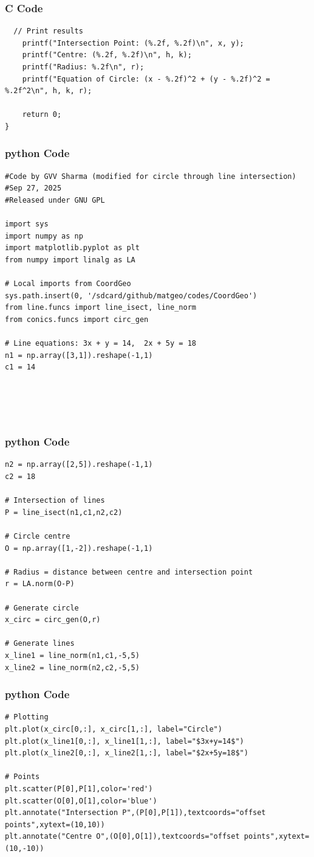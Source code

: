 \documentclass{beamer}
\begin{document}
\begin{frame}[fragile]
    \frametitle{C Code }
    \begin{lstlisting}
  // Print results
    printf("Intersection Point: (%.2f, %.2f)\n", x, y);
    printf("Centre: (%.2f, %.2f)\n", h, k);
    printf("Radius: %.2f\n", r);
    printf("Equation of Circle: (x - %.2f)^2 + (y - %.2f)^2 = %.2f^2\n", h, k, r);

    return 0;
}
    \end{lstlisting}
\end{frame}
\begin{frame}[fragile]
    \frametitle{python Code }
    \begin{lstlisting}
#Code by GVV Sharma (modified for circle through line intersection)
#Sep 27, 2025
#Released under GNU GPL

import sys
import numpy as np
import matplotlib.pyplot as plt
from numpy import linalg as LA

# Local imports from CoordGeo
sys.path.insert(0, '/sdcard/github/matgeo/codes/CoordGeo')
from line.funcs import line_isect, line_norm
from conics.funcs import circ_gen

# Line equations: 3x + y = 14,  2x + 5y = 18
n1 = np.array([3,1]).reshape(-1,1)
c1 = 14





  \end{lstlisting}
\end{frame}
\begin{frame}[fragile]
    \frametitle{python Code }
    \begin{lstlisting}
n2 = np.array([2,5]).reshape(-1,1)
c2 = 18

# Intersection of lines
P = line_isect(n1,c1,n2,c2)

# Circle centre
O = np.array([1,-2]).reshape(-1,1)

# Radius = distance between centre and intersection point
r = LA.norm(O-P)

# Generate circle
x_circ = circ_gen(O,r)

# Generate lines
x_line1 = line_norm(n1,c1,-5,5)
x_line2 = line_norm(n2,c2,-5,5)

\end{lstlisting}
\end{frame}
\begin{frame}[fragile]
    \frametitle{python Code }
    \begin{lstlisting}
# Plotting
plt.plot(x_circ[0,:], x_circ[1,:], label="Circle")
plt.plot(x_line1[0,:], x_line1[1,:], label="$3x+y=14$")
plt.plot(x_line2[0,:], x_line2[1,:], label="$2x+5y=18$")

# Points
plt.scatter(P[0],P[1],color='red')
plt.scatter(O[0],O[1],color='blue')
plt.annotate("Intersection P",(P[0],P[1]),textcoords="offset points",xytext=(10,10))
plt.annotate("Centre O",(O[0],O[1]),textcoords="offset points",xytext=(10,-10))


    \end{lstlisting}
\end{frame}
\end{document}

